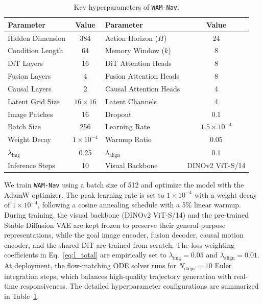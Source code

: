 \documentclass{article}
\begin{document}
\begin{table}[t]
\centering
\caption{Key hyperparameters of \texttt{WAM-Nav}.}
\label{tab:hyperparameters}

\begin{tabular*}{\columnwidth}{@{\extracolsep{\fill}}lc|lc}
\toprule
\textbf{Parameter} & \textbf{Value} & \textbf{Parameter} & \textbf{Value} \\
\midrule
Hidden Dimension & 384 & Action Horizon ($H$) & 24 \\
Condition Length & 64 & Memory Window ($k$) & 8 \\
DiT Layers & 16 & DiT Attention Heads & 8 \\
Fusion Layers & 4 & Fusion Attention Heads & 8 \\
Causal Layers & 2 & Causal Attention Heads & 4 \\
Latent Grid Size & $16 \times 16$ & Latent Channels & 4 \\
Image Patches & 16 & Dropout & 0.1 \\
Batch Size & 256 & Learning Rate & $1.5 \times 10^{-4}$ \\
Weight Decay & $1\times10^{-4}$ & Warmup Ratio & 0.05 \\
$\lambda_{\mathrm{img}}$ & 0.25 & $\lambda_{\mathrm{align}}$ & 0.1 \\
Inference Steps & 10 & Visual Backbone & DINOv2 ViT-S/14 \\
\bottomrule
\end{tabular*}
\end{table}

We train \texttt{WAM-Nav} using a batch size of 512 and optimize the model with the AdamW optimizer. The peak learning rate is set to $1 \times 10^{-4}$ with a weight decay of $1 \times 10^{-4}$, following a cosine annealing schedule with a 5\% linear warmup. During training, the visual backbone (DINOv2 ViT-S/14) and the pre-trained Stable Diffusion VAE are kept frozen to preserve their general-purpose representations, while the goal image encoder, fusion decoder, causal motion encoder, and the shared DiT are trained from scratch. The loss weighting coefficients in Eq.~\ref{eq:l_total} are empirically set to $\lambda_{\mathrm{img}}=0.05$ and $\lambda_{\mathrm{align}}=0.01$. At deployment, the flow-matching ODE solver runs for $N_{\mathrm{steps}}=10$ Euler integration steps, which balances high-quality trajectory generation with real-time responsiveness. The detailed hyperparameter configurations are summarized in Table~\ref{tab:hyperparameters}.
\end{document}
